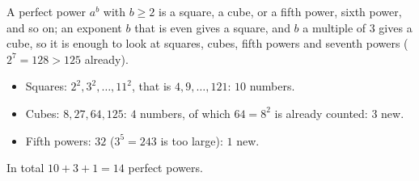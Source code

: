 A perfect power $a^b$ with $b\ge2$ is a square, a cube, or a fifth power, sixth power, and so on; an exponent $b$ that is even gives a square, and $b$ a multiple of $3$ gives a cube, so it is enough to look at squares, cubes, fifth powers and seventh powers ($2^7=128>125$ already).
\begin{itemize}
\item Squares: $2^2,3^2,\ldots,11^2$, that is $4,9,\ldots,121$: $10$ numbers.
\item Cubes: $8,27,64,125$: $4$ numbers, of which $64=8^2$ is already counted: $3$ new.
\item Fifth powers: $32$ ($3^5=243$ is too large): $1$ new.
\end{itemize}
In total $10+3+1=\boxed{14}$ perfect powers.
